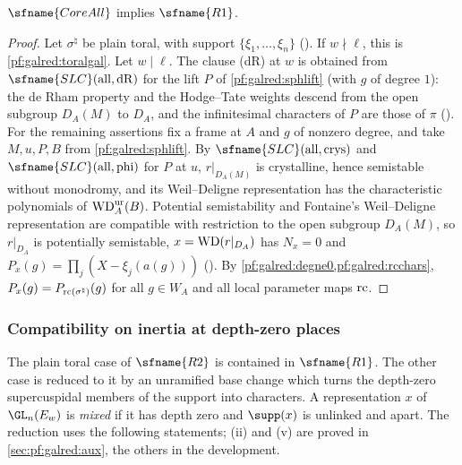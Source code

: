 \begin{theorem}\label{pf:galred:R1thm}
$\sfname{CoreAll}$ implies $\sfname{R1}$.
\end{theorem}

\begin{proof}
Let $\sigma^\natural$ be plain toral, with support $\{\xi_1,\dots,\xi_n\}$
(). If $w\nmid\ell$, this is \cref{pf:galred:toralgal}. Let $w\mid\ell$.
The clause (dR) at $w$ is obtained from $\sfname{SLC}(\mathrm{all},\mathrm{dR})$ for the lift $P$ of
\cref{pf:galred:sphlift} (with $g$ of degree $1$): the de Rham property and the Hodge--Tate weights descend from the
open subgroup $D_A(M)$ to $D_A$, and the infinitesimal characters of $P$ are those of $\pi$
(). For the remaining assertions fix a frame at $A$
and $g$ of nonzero degree, and take $M,u,P,B$ from \cref{pf:galred:sphlift}. By $\sfname{SLC}(\mathrm{all},\mathrm{crys})$
and $\sfname{SLC}(\mathrm{all},\mathrm{phi})$ for $P$ at $u$, $r|_{D_A(M)}$ is crystalline, hence semistable without
monodromy, and its Weil--Deligne representation has the characteristic polynomials of $\mathrm{WD}^{\mathrm{ur}}_A(B)$. Potential
semistability and Fontaine's Weil--Deligne representation are compatible with restriction to the open subgroup $D_A(M)$,
so $r|_{D_A}$ is potentially semistable, $x=\mathrm{WD}(r|_{D_A})$ has $N_x=0$ and $P_x(g)=\prod_j(X-\xi_j(a(g)))$
(). By \cref{pf:galred:degne0,pf:galred:rcchars},
$P_x(g)=P_{\mathrm{rc}(\sigma^\natural)}(g)$ for all $g\in W_A$ and all local parameter maps $\mathrm{rc}$.
\end{proof}

\subsubsection{Compatibility on inertia at depth-zero places}\label{sec:pf:galred:R2}

The plain toral case of $\sfname{R2}$ is contained in $\sfname{R1}$. The other case is reduced to it by an unramified
base change which turns the depth-zero supercuspidal members of the support into characters. A representation $x$ of
$\GL_n(E_w)$ is \emph{mixed} if it has depth zero and $\supp(x)$ is unlinked and apart. The reduction uses the
following statements; (ii) and (v) are proved in \cref{sec:pf:galred:aux}, the others in the development.

